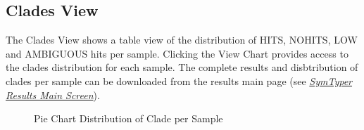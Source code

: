 \documentclass[letterpaper,10pt,english]{sphinxmanual}
\begin{document}
\subsection{Clades View}
\label{Web:clades-view}
The Clades View shows a table view of the distribution of HITS,
NOHITS, LOW and AMBIGUOUS hits per sample.  Clicking the View Chart
provides access to the clades distribution for each sample. The
complete results and disbtribution of clades per sample can be
downloaded from the results main page (see {\hyperref[Web:main-results-page]{\emph{SymTyper Results Main Screen}}}).
\begin{figure}[htbp]
\centering
\capstart

\caption{Pie Chart Distribution of Clade per Sample}\end{figure}
\end{document}
